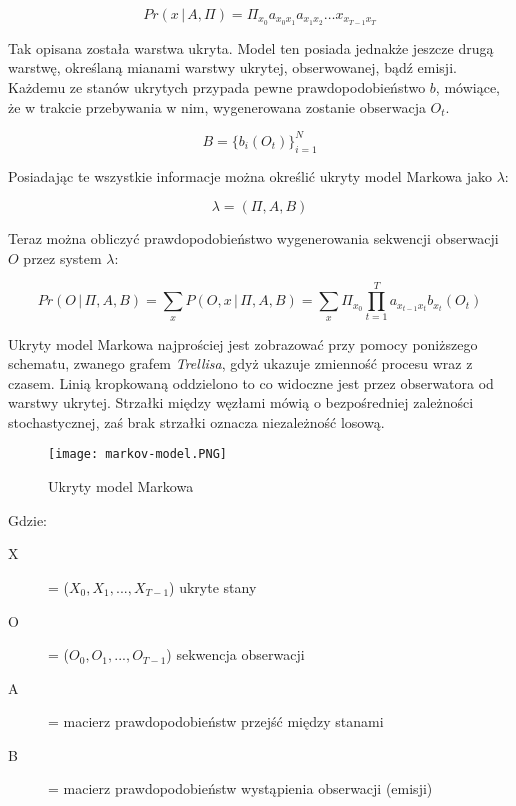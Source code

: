 $$ Pr(x\,|\,A,\Pi) = \Pi_{x_{0}}a_{x_{0}x_{1}}a_{x_{1}x_{2}} \dots x_{x_{T-1}x_{T}} $$

Tak opisana została warstwa ukryta. Model ten posiada jednakże jeszcze drugą warstwę, określaną mianami warstwy ukrytej, obserwowanej, bądź emisji. Każdemu ze stanów ukrytych przypada pewne prawdopodobieństwo $b$, mówiące, że w trakcie przebywania w nim, wygenerowana zostanie obserwacja $O_{t}$.

$$ B=\{b_{i}(O_{t})\}_{i=1}^{N} $$

Posiadając te wszystkie informacje można określić ukryty model Markowa jako $\lambda$:

$$ \lambda = (\Pi,A,B) $$

Teraz można obliczyć prawdopodobieństwo wygenerowania sekwencji obserwacji $O$ przez system $\lambda$:

$$ Pr(O\,|\,\Pi,A,B) = \sum_{x}P(O,x\,|\,\Pi,A,B) = \sum_{x}\Pi_{x_{0}}\prod_{t=1}^{T}a_{x_{t-1}x_{t}}b_{x_{t}}(O_{t}) $$

Ukryty model Markowa najprościej jest zobrazować przy pomocy poniższego schematu, zwanego grafem \textit{Trellisa}, gdyż ukazuje zmienność procesu wraz z czasem. Linią kropkowaną oddzielono to co widoczne jest przez obserwatora od warstwy ukrytej. Strzałki między węzłami mówią o bezpośredniej zależności stochastycznej, zaś brak strzałki oznacza niezależność losową.

\begin{figure}[h!]
	\centering
	\texttt{[image: markov-model.PNG]}
	\label{markov-model}
	\caption{Ukryty model Markowa}
\end{figure}

Gdzie:

\begin{description}
  \item[X] = ($X_0, X_1, ..., X_{T-1}$) ukryte stany
  \item[O] = ($O_0, O_1, ..., O_{T-1}$) sekwencja obserwacji
  \item[A] = macierz prawdopodobieństw przejść między stanami
  \item[B] = macierz prawdopodobieństw wystąpienia obserwacji (emisji)
\end{description}
